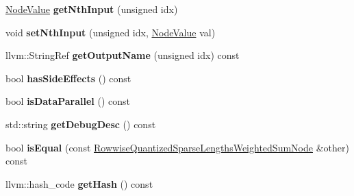 \begin{DoxyCompactItemize}
\hyperlink{structglow_1_1_node_value}{Node\+Value} {\bfseries get\+Nth\+Input} (unsigned idx)
\item 
\mbox{\label{classglow_1_1_rowwise_quantized_sparse_lengths_weighted_sum_node_ac37966ae125dfb9abbab5ce5a7dcb61b}} 
void {\bfseries set\+Nth\+Input} (unsigned idx, \hyperlink{structglow_1_1_node_value}{Node\+Value} val)
\item 
\mbox{\label{classglow_1_1_rowwise_quantized_sparse_lengths_weighted_sum_node_a92eddcb12bf9d72e773fa3cc4a43e52f}} 
llvm\+::\+String\+Ref {\bfseries get\+Output\+Name} (unsigned idx) const
\item 
\mbox{\label{classglow_1_1_rowwise_quantized_sparse_lengths_weighted_sum_node_a2d0018c98b10f7c6579d27617bf6a558}} 
bool {\bfseries has\+Side\+Effects} () const
\item 
\mbox{\label{classglow_1_1_rowwise_quantized_sparse_lengths_weighted_sum_node_acdbcd5567ead0d9a6a81373b1f8d1f4b}} 
bool {\bfseries is\+Data\+Parallel} () const
\item 
\mbox{\label{classglow_1_1_rowwise_quantized_sparse_lengths_weighted_sum_node_a2015f8b790ed13e7e9f378f08bc906ef}} 
std\+::string {\bfseries get\+Debug\+Desc} () const
\item 
\mbox{\label{classglow_1_1_rowwise_quantized_sparse_lengths_weighted_sum_node_a728b9fd9f7ee0a13a7fe463b500e33bc}} 
bool {\bfseries is\+Equal} (const \hyperlink{classglow_1_1_rowwise_quantized_sparse_lengths_weighted_sum_node}{Rowwise\+Quantized\+Sparse\+Lengths\+Weighted\+Sum\+Node} \&other) const
\item 
\mbox{\label{classglow_1_1_rowwise_quantized_sparse_lengths_weighted_sum_node_a7e81c914eb9255b6b24896d9f1322651}} 
llvm\+::hash\+\_\+code {\bfseries get\+Hash} () const
\item 

\end{DoxyCompactItemize}
